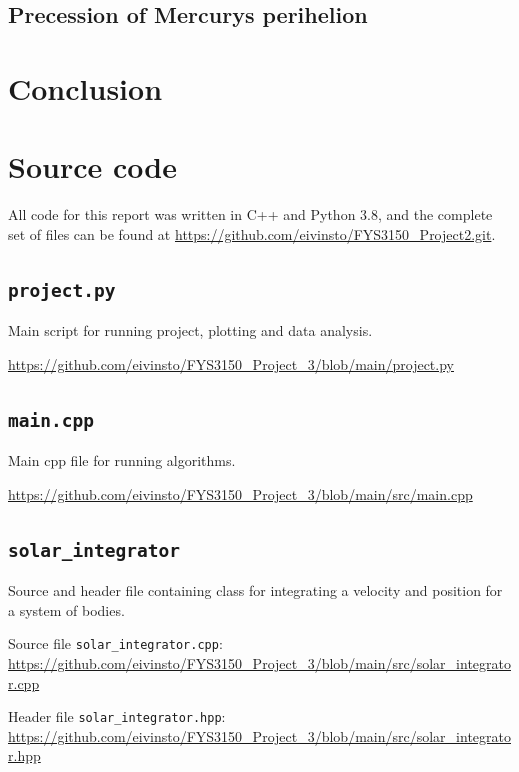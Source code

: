 \documentclass[reprint,english,notitlepage]{revtex4-1}  %
\begin{document}
\subsection{Precession of Mercurys perihelion} \label{sec:V:d}






\section{Conclusion} \label{sec:VI}





\onecolumngrid
{}
\newpage
\twocolumngrid

\appendix
\section{Source code} \label{A}
All code for this report was written in C++ and Python 3.8, and the complete set of files can be found at
\url{https://github.com/eivinsto/FYS3150_Project2.git}.

\cprotect\subsection{\verb+project.py+} \label{A.1}
Main script for running project, plotting and data analysis.

\url{https://github.com/eivinsto/FYS3150_Project_3/blob/main/project.py}

\cprotect\subsection{\verb+main.cpp+} \label{A.2}
Main cpp file for running algorithms.

\url{https://github.com/eivinsto/FYS3150_Project_3/blob/main/src/main.cpp}

\cprotect\subsection{\verb+solar_integrator+} \label{A.3}
Source and header file containing class for integrating a velocity and position for a system of bodies.

Source file \verb+solar_integrator.cpp+:
\url{https://github.com/eivinsto/FYS3150_Project_3/blob/main/src/solar_integrator.cpp}

Header file \verb+solar_integrator.hpp+:
\url{https://github.com/eivinsto/FYS3150_Project_3/blob/main/src/solar_integrator.hpp}
\end{document}
